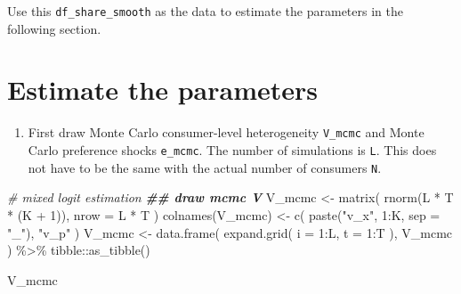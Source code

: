 \documentclass[
]{book}
\newenvironment{Shaded}{\begin{snugshade}}{\end{snugshade}}
\newcommand{\AttributeTok}[1]{\textcolor[rgb]{0.77,0.63,0.00}{#1}}
\newcommand{\CommentTok}[1]{\textcolor[rgb]{0.56,0.35,0.01}{\textit{#1}}}
\newcommand{\DecValTok}[1]{\textcolor[rgb]{0.00,0.00,0.81}{#1}}
\newcommand{\DocumentationTok}[1]{\textcolor[rgb]{0.56,0.35,0.01}{\textbf{\textit{#1}}}}
\newcommand{\FunctionTok}[1]{\textcolor[rgb]{0.00,0.00,0.00}{#1}}
\newcommand{\NormalTok}[1]{#1}
\newcommand{\OtherTok}[1]{\textcolor[rgb]{0.56,0.35,0.01}{#1}}
\newcommand{\SpecialCharTok}[1]{\textcolor[rgb]{0.00,0.00,0.00}{#1}}
\newcommand{\StringTok}[1]{\textcolor[rgb]{0.31,0.60,0.02}{#1}}
\providecommand{\tightlist}{%
  \setlength{\itemsep}{0pt}\setlength{\parskip}{0pt}}
\begin{document}
Use this \texttt{df\_share\_smooth} as the data to estimate the parameters in the following section.

\hypertarget{estimate-the-parameters-2}{%
\section{Estimate the parameters}\label{estimate-the-parameters-2}}

\begin{enumerate}
\def\labelenumi{\arabic{enumi}.}
\tightlist
\item
  First draw Monte Carlo consumer-level heterogeneity \texttt{V\_mcmc} and Monte Carlo preference shocks \texttt{e\_mcmc}. The number of simulations is \texttt{L}. This does not have to be the same with the actual number of consumers \texttt{N}.
\end{enumerate}

\begin{Shaded}
\begin{Highlighting}[]
\CommentTok{\# mixed logit estimation}
\DocumentationTok{\#\# draw mcmc V}
\NormalTok{V\_mcmc }\OtherTok{\textless{}{-}} 
  \FunctionTok{matrix}\NormalTok{(}
    \FunctionTok{rnorm}\NormalTok{(L }\SpecialCharTok{*}\NormalTok{ T }\SpecialCharTok{*}\NormalTok{ (K }\SpecialCharTok{+} \DecValTok{1}\NormalTok{)), }
    \AttributeTok{nrow =}\NormalTok{ L }\SpecialCharTok{*}\NormalTok{ T}
\NormalTok{    ) }
\FunctionTok{colnames}\NormalTok{(V\_mcmc) }\OtherTok{\textless{}{-}} 
  \FunctionTok{c}\NormalTok{(}
    \FunctionTok{paste}\NormalTok{(}\StringTok{"v\_x"}\NormalTok{, }\DecValTok{1}\SpecialCharTok{:}\NormalTok{K, }\AttributeTok{sep =} \StringTok{"\_"}\NormalTok{), }
    \StringTok{"v\_p"}
\NormalTok{    )}
\NormalTok{V\_mcmc }\OtherTok{\textless{}{-}} 
  \FunctionTok{data.frame}\NormalTok{(}
  \FunctionTok{expand.grid}\NormalTok{(}
    \AttributeTok{i =} \DecValTok{1}\SpecialCharTok{:}\NormalTok{L, }
    \AttributeTok{t =} \DecValTok{1}\SpecialCharTok{:}\NormalTok{T}
\NormalTok{    ),}
\NormalTok{  V\_mcmc}
\NormalTok{  ) }\SpecialCharTok{\%\textgreater{}\%}
\NormalTok{  tibble}\SpecialCharTok{::}\FunctionTok{as\_tibble}\NormalTok{() }
\end{Highlighting}
\end{Shaded}

\begin{Shaded}
\begin{Highlighting}[]
\NormalTok{V\_mcmc}
\end{Highlighting}
\end{Shaded}
\end{document}
